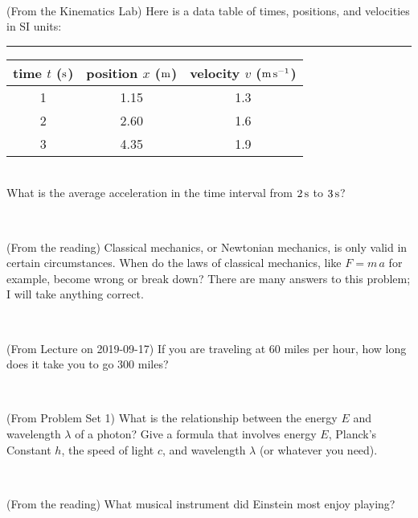 \documentclass[12pt, letterpaper]{article}
\begin{document}
\vfill ~

\begin{problem} (From the Kinematics Lab)
Here is a data table of times, positions, and velocities in SI units:\\
\rule{1.0in}{0pt}\begin{tabular}{c|c|c}
time $t$ ($\mathrm{s}$) & position $x$ ($\mathrm{m}$) & velocity $v$ ($\mathrm{m}\,\mathrm{s}^{-1}$) \\
\hline
1 & 1.15 & 1.3 \\
2 & 2.60 & 1.6 \\
3 & 4.35 & 1.9 \\
\hline
\end{tabular}\\
What is the average acceleration in the time interval from $2\,\mathrm{s}$ to $3\,\mathrm{s}$?
\end{problem}


\vfill ~


\clearpage


\begin{problem} (From the reading)
Classical mechanics, or Newtonian mechanics, is only valid in certain
circumstances. When do the laws of classical mechanics, like $F =
m\,a$ for example, become wrong or break down? There are many answers
to this problem; I will take anything correct.
\end{problem}


\vfill ~

\begin{problem} (From Lecture on 2019-09-17)
If you are traveling at 60 miles per hour, how long does
it take you to go 300 miles?
\end{problem}


\vfill ~

\begin{problem} (From Problem Set 1)
What is the relationship between the energy $E$ and wavelength
$\lambda$ of a photon? Give a formula that involves energy $E$,
Planck's Constant $h$, the speed of light $c$, and wavelength
$\lambda$ (or whatever you need).
\end{problem}

\vfill ~

\begin{problem} (From the reading)
What musical instrument did Einstein most enjoy playing?
\end{problem}


\vfill ~


\cleardoublepage
\end{document}
